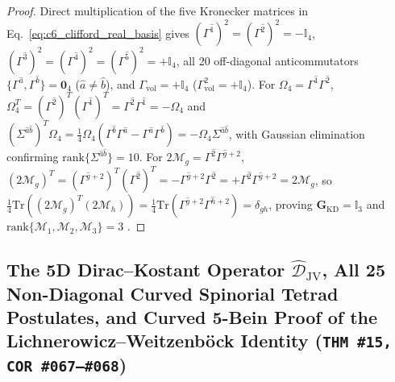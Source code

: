 \documentclass[11pt,a4paper]{article}
\newcommand{\catD}{\text{\textbf{\textcolor{blue!75!black}{[D]}}}}
\theoremstyle{definition}
\theoremstyle{plain}
\theoremstyle{remark}
\begin{document}
\begin{proof}
Direct multiplication of the five Kronecker matrices in Eq.~\eqref{eq:c6_clifford_real_basis} gives $(\Gamma^{\hat{1}})^2 = (\Gamma^{\hat{2}})^2 = -\mathbb{I}_4$, $(\Gamma^{\hat{3}})^2 = (\Gamma^{\hat{4}})^2 = (\Gamma^{\hat{5}})^2 = +\mathbb{I}_4$, all 20 off-diagonal anticommutators $\{\Gamma^{\hat{a}}, \Gamma^{\hat{b}}\} = \mathbf{0}_4$ ($\hat{a} \neq \hat{b}$), and $\Gamma_{\mathrm{vol}} = +\mathbb{I}_4$ ($\Gamma_{\mathrm{vol}}^2 = +\mathbb{I}_4$). For $\Omega_4 = \Gamma^{\hat{1}}\Gamma^{\hat{2}}$, $\Omega_4^T = (\Gamma^{\hat{2}})^T(\Gamma^{\hat{1}})^T = \Gamma^{\hat{2}}\Gamma^{\hat{1}} = -\Omega_4$ and $(\Sigma^{\hat{a}\hat{b}})^T\Omega_4 = \frac{1}{4}\Omega_4(\Gamma^{\hat{b}}\Gamma^{\hat{a}} - \Gamma^{\hat{a}}\Gamma^{\hat{b}}) = -\Omega_4\Sigma^{\hat{a}\hat{b}}$, with Gaussian elimination confirming $\mathrm{rank}\{\Sigma^{\hat{a}\hat{b}}\} = 10$. For $2\mathcal{M}_g = \Gamma^{\hat{2}}\Gamma^{\hat{g}+2}$, $(2\mathcal{M}_g)^T = (\Gamma^{\hat{g}+2})^T(\Gamma^{\hat{2}})^T = -\Gamma^{\hat{g}+2}\Gamma^{\hat{2}} = +\Gamma^{\hat{2}}\Gamma^{\hat{g}+2} = 2\mathcal{M}_g$, so $\frac{1}{4}\mathrm{Tr}((2\mathcal{M}_g)^T(2\mathcal{M}_h)) = \frac{1}{4}\mathrm{Tr}(\Gamma^{\hat{g}+2}\Gamma^{\hat{h}+2}) = \delta_{gh}$, proving $\mathbf{G}_{\mathrm{KD}} = \mathbb{I}_3$ and $\mathrm{rank}\{\mathcal{M}_1, \mathcal{M}_2, \mathcal{M}_3\} = 3$ \catD.
\end{proof}

\subsection{\texorpdfstring{The 5D Dirac--Kostant Operator $\widehat{\mathcal{D}}_{\mathrm{JV}}$, All 25 Non-Diagonal Curved Spinorial Tetrad Postulates, and Curved 5-Bein Proof of the Lichnerowicz--Weitzenb\"ock Identity (\texttt{THM~\#15, COR~\#067--\#068})}{The 5D Dirac-Kostant Operator, All 25 Non-Diagonal Curved Spinorial Tetrad Postulates, and Curved 5-Bein Proof of the Lichnerowicz-Weitzenbock Identity}}
\end{document}
